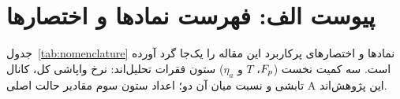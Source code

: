 \appendix
\section*{پیوست الف: فهرست نمادها و اختصارها}
\label{sec:appendix-nomenclature}

جدول~\ref{tab:nomenclature} نمادها و اختصارهای پرکاربرد این مقاله را یک‌جا
گرد آورده است. سه کمیت نخست ($F_p$، $T$ و $\eta_a$) ستون فقرات تحلیل‌اند:
نرخ واپاشی کل، کانال تابشی و نسبت میان آن دو؛ اعداد ستون سوم مقادیر حالت
اصلی A این پژوهش‌اند.

